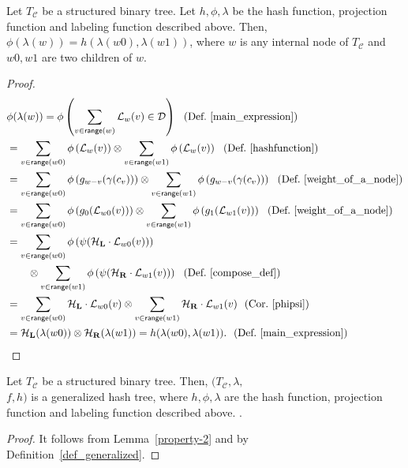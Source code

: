 \begin{lemma}\label{property-2}
Let $T_\mathcal{C}$ be a structured binary tree. Let $h, \phi, \lambda$ be the hash function, projection function and labeling function described above. Then, $\phi(\lambda(w)) = h(\lambda(w{0}), \lambda(w{1}))$, where $w$ is any internal node of $T_\mathcal{C}$ and $w{0}, w{1}$ are two children of $w$.
\end{lemma}
\begin{proof}
\begingroup\makeatletter{}\check@mathfonts
\def\maketag@@@#1{\hbox{\m@th\large\normalfont#1}}%
\begin{align*}
&\phi(\lambda(w))=\phi\left(\sum_{v\in \mathsf{range}(w)} \mathcal{L}_w(v)\in {\mathcal{D}} \right) 
\nonumber \text{\ \ (Def.~\ref{main_expression})}\\
&={\sum_{v\in \mathsf{range}(w0)} \phi\left(\mathcal{L}_w(v)\right)} \otimes \sum_{v\in \mathsf{range}(w1)}\phi\left(\mathcal{L}_w(v)\right) 
\nonumber \text{\ \ (Def.~\ref{hashfunction})}\\
&=\sum_{v\in \mathsf{range}(w0)}\phi\left(g_{w-v}(\gamma (c_v))\right) \otimes \sum_{v\in \mathsf{range}(w1)}\phi\left(g_{w-v}(\gamma(c_v))\right) 
\nonumber \text{\ \ (Def.~\ref{weight_of_a_node})}\\
&=\sum_{v\in \mathsf{range}(w0)}\phi\left(g_0(\mathcal{L}_{w0}(v))\right) \otimes \sum_{v\in \mathsf{range}(w1)}\phi\left(g_1(\mathcal{L}_{w1}(v))\right) 
\nonumber \text{\ \ (Def.~\ref{weight_of_a_node})}\\
&=\sum_{v\in \mathsf{range}(w0)}\phi\left(\psi( {\bf {\cal H}_{L}} \cdot \mathcal{L}_{w0}(v))\right) \\
& \quad \quad \otimes \sum_{v\in \mathsf{range}(w1)}\phi \left(\psi({\bf {\cal H}_{R}} \cdot\mathcal{L}_{w1}(v))\right) 
\nonumber \text{\ \ (Def.~\ref{compose_def})}\\
&=\sum_{v\in \mathsf{range}(w0)} {\bf {\cal H}_{L}} \cdot\mathcal{L}_{w0}(v)
 \otimes \sum_{v\in \mathsf{range}(w1)}{\bf {\cal H}_{R}}\cdot\mathcal{L}_{w1}(v) 
\nonumber \text{\ \ (Cor.~\ref{phipsi})}\\
&={\bf {\cal H}_{L}} (\lambda(w0)) \otimes {\bf {\cal H}_{R}} (\lambda(w1)  ) =h(\lambda(w0), \lambda(w1)).
\nonumber \text{\ \ (Def.~\ref{main_expression})} 
\end{align*}\endgroup
\end{proof}
\begin{theorem}\label{final_thm}
Let $T_\mathcal{C}$ be a structured binary tree. Then, $(T_\mathcal{C},\lambda,$\\
$f,h)$ is a generalized hash tree, where $h, \phi, \lambda$ are the hash function, projection function and labeling function described above. .
\end{theorem}
\begin{proof}
It follows from Lemma~\ref{property-2} and by Definition~\ref{def_generalized}. 
\end{proof}

